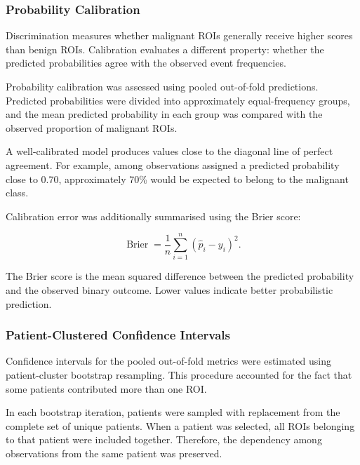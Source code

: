 \documentclass[12pt,twocolumn]{article}
\begin{document}
\subsubsection{Probability Calibration}
\label{subsubsec:probability_calibration}

Discrimination measures whether malignant ROIs generally receive
higher scores than benign ROIs. Calibration evaluates a different
property: whether the predicted probabilities agree with the observed
event frequencies.

Probability calibration was assessed using pooled out-of-fold
predictions. Predicted probabilities were divided into approximately
equal-frequency groups, and the mean predicted probability in each
group was compared with the observed proportion of malignant ROIs.

A well-calibrated model produces values close to the diagonal line of
perfect agreement. For example, among observations assigned a
predicted probability close to 0.70, approximately 70\% would be
expected to belong to the malignant class.

Calibration error was additionally summarised using the Brier score:

\begin{equation}
\operatorname{Brier}
=
\frac{1}{n}
\sum_{i=1}^{n}
\left(
\widehat{p}_i-y_i
\right)^2.
\label{eq:brier_score}
\end{equation}

The Brier score is the mean squared difference between the predicted
probability and the observed binary outcome. Lower values indicate
better probabilistic prediction.






\subsubsection{Patient-Clustered Confidence Intervals}
\label{subsubsec:clustered_confidence_intervals}

Confidence intervals for the pooled out-of-fold metrics were estimated
using patient-cluster bootstrap resampling. This procedure accounted
for the fact that some patients contributed more than one ROI.

In each bootstrap iteration, patients were sampled with replacement
from the complete set of unique patients. When a patient was selected,
all ROIs belonging to that patient were included together. Therefore,
the dependency among observations from the same patient was preserved.
\end{document}
